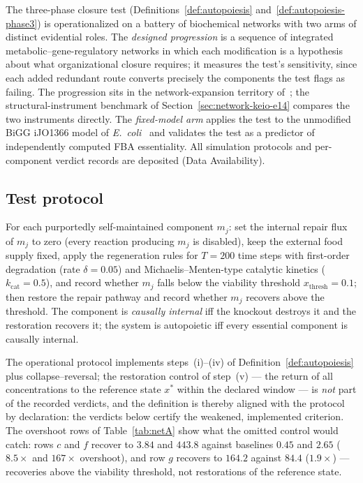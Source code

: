 \documentclass[11pt,a4paper]{article}
\theoremstyle{plain}
\theoremstyle{definition}
\theoremstyle{remark}
\begin{document}
The three-phase closure test (Definitions~\ref{def:autopoiesis}
and~\ref{def:autopoiesis-phase3}) is operationalized on a battery
of biochemical networks with two arms of distinct evidential roles.
The \emph{designed progression} is a sequence of integrated
metabolic--gene-regulatory networks in which each modification is
a hypothesis about what organizational closure requires; it
measures the test's sensitivity, since each added redundant route
converts precisely the components the test flags as failing. The
progression sits in the network-expansion territory
of~\citet{handorf2005network}; the structural-instrument benchmark
of Section~\ref{sec:network-keio-e14} compares the two instruments
directly. The
\emph{fixed-model arm} applies the test to the unmodified BiGG
iJO1366 model of \emph{E.~coli}~\cite{orth2011} and validates the
test as a predictor of independently computed FBA essentiality.
All simulation protocols and per-component verdict records are
deposited (Data Availability).

\subsection{Test protocol}

For each purportedly self-maintained component $m_j$: set the
internal repair flux of $m_j$ to zero (every reaction producing
$m_j$ is disabled), keep the external food supply fixed, apply the
regeneration rules for $T=200$ time steps with first-order
degradation (rate $\delta=0.05$) and Michaelis--Menten-type
catalytic kinetics ($k_{\mathrm{cat}}=0.5$), and record whether
$m_j$ falls below the viability threshold
$x_{\mathrm{thresh}}=0.1$; then restore the repair pathway and
record whether $m_j$ recovers above the threshold. The component
is \emph{causally internal} iff the knockout destroys it and the
restoration recovers it; the system is autopoietic iff every
essential component is causally internal.

The operational protocol implements steps~(i)--(iv) of
Definition~\ref{def:autopoiesis} plus collapse--reversal; the
restoration control of step~(v) --- the return of all concentrations
to the reference state $x^{*}$ within the declared window --- is
\emph{not} part of the recorded verdicts, and the definition is
thereby aligned with the protocol by declaration: the verdicts
below certify the weakened, implemented criterion. The overshoot
rows of Table~\ref{tab:netA} show what the omitted control would
catch: rows $c$ and $f$ recover to $3.84$ and $443.8$ against
baselines $0.45$ and $2.65$ ($8.5\times$ and $167\times$
overshoot), and row $g$ recovers to $164.2$ against $84.4$
($1.9\times$) --- recoveries above the viability threshold, not
restorations of the reference state.
\end{document}
